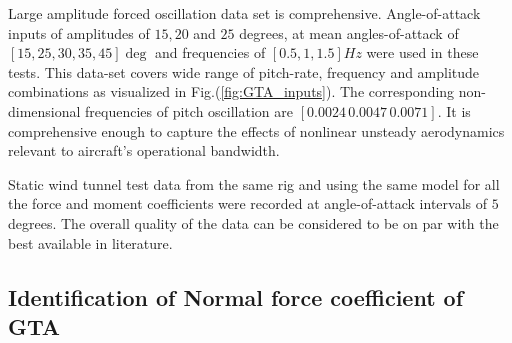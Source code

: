 \documentclass{AIAA}
\begin{document}

Large amplitude forced oscillation data set is comprehensive. Angle-of-attack inputs of amplitudes of $15, 20$ and $25$ degrees, at mean angles-of-attack of $[15, 25, 30, 35, 45] \deg$ and frequencies of $[0.5,1,1.5] Hz$  were used in these tests. This data-set covers wide range of pitch-rate, frequency and amplitude combinations as visualized in Fig.(\ref{fig:GTA_inputs}). The corresponding non-dimensional frequencies of pitch oscillation are $[0.0024 \, 0.0047 \, 0.0071]$. It is comprehensive enough to capture the effects of  nonlinear unsteady aerodynamics relevant to aircraft's operational bandwidth.

Static wind tunnel test data from the same rig and using the same model for all the force and moment coefficients were recorded at angle-of-attack intervals of $5$ degrees. The overall quality of the data can be considered to be on par with the best available in literature.

\subsection{Identification of Normal force coefficient of GTA}


\end{document}
